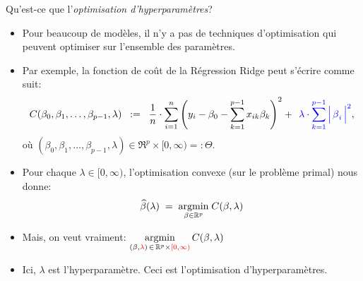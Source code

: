 

\begin{frame}{\small Qu'est-ce que \Large l'\textit{optimisation d'hyperparam\`etres}?}

\small

\vskip -0.15cm
\begin{itemize}
\pause\item
	Pour beaucoup de mod\`eles, il n'y a pas de techniques d'optimisation
	qui peuvent optimiser sur l'ensemble des param\`etres.
\pause\item
	{\scriptsize Par exemple, la fonction de co\^{u}t de la R\'egression Ridge peut s'\'ecrire comme suit:}
	{\scriptsize\begin{equation*}
	C(\beta_{0},\beta_{1},\ldots,\beta_{p-1},\lambda)
	\;\; := \;\;
		\dfrac{1}{n}\cdot
		\overset{n}{\underset{i=1}{\sum}}\left(
			y_{i} - \beta_{0} - \overset{p-1}{\underset{k=1}{\sum}}\,x_{ik}\beta_{k}
			\right)^{2}
		+\;\,
		{\color{blue}\lambda\cdot\overset{p-1}{\underset{k=1}{\sum}}\left\vert\,\overset{{\color{white}.}}{\beta}_{i}\,\right\vert^{2}},
	\end{equation*}}
	{\scriptsize o\`u $(\beta_{0},\beta_{1},\ldots,\beta_{p-1},\lambda) \in \Re^{p} \times [0,\infty) =: \Theta$.}
\pause\item
	{\scriptsize Pour chaque $\lambda \in [0,\infty)$, l'optimisation convexe (sur le probl\`eme primal) nous donne:}
	{\scriptsize\begin{equation*}
	\widehat{\beta}(\lambda)
	\; = \;
		\underset{\beta \in \Re^{p}}{\textnormal{argmin}}\;C(\beta,\lambda)
	\end{equation*}}
\pause\item
	\vskip -0.5cm
	{\scriptsize Mais, on veut vraiment:
	\;$\underset{(\beta,{\color{red}\lambda}) \,\in\, \Re^{p} \times {\color{red}[0,\infty)}}{\textnormal{argmin}}\,C(\beta,\lambda)$}
\pause\item
	Ici, {\color{red}$\lambda$ est l'hyperparam\`etre}.
	\vskip -0.01cm
	\vskip -0.01cm
	\pause Ceci est l'{\color{red}optimisation d'hyperparam\`etres}.
\end{itemize}

\end{frame}
\normalsize

